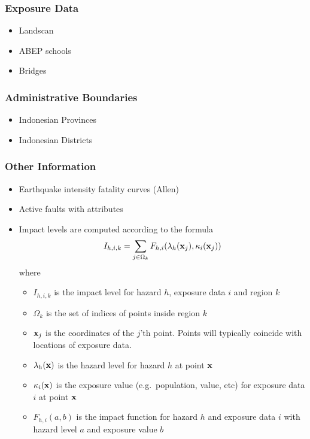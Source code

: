 \documentclass[a4paper]{article}
\begin{document}
\subsubsection*{Exposure Data}
\begin{itemize}  
  \item Landscan
  \item ABEP schools
  \item Bridges
\end{itemize} 

\subsubsection*{Administrative Boundaries}
\begin{itemize}  
   \item Indonesian Provinces
   \item Indonesian Districts
\end{itemize} 
   
\subsubsection*{Other Information}
\begin{itemize} 
  \item Earthquake intensity fatality curves (Allen)
  \item Active faults with attributes
  \item Impact levels are computed according to the formula
  \[
     I_{h,i,k} = \sum_{j \in \Omega_k} F_{h,i}(\lambda_h(\bold{x}_j), \kappa_i(\bold{x}_j))
  \] where
  \begin{itemize} 
    \item $I_{h,i,k}$ is the impact level for hazard $h$, exposure data $i$ and region $k$
    \item $\Omega_k$ is the set of indices of points inside region $k$
    \item $\bold{x}_j$ is the coordinates of the $j$'th point. Points will typically coincide with locations of exposure data.
    \item $\lambda_h(\bold{x})$ is the hazard level for hazard $h$ at point $\bold{x}$
    \item $\kappa_i(\bold{x})$ is the exposure value (e.g.\ population,  value, etc) for exposure data $i$ at point $\bold{x}$
    \item $F_{h,i}(a, b)$ is the impact function for hazard $h$ and exposure data $i$ with hazard level $a$ and exposure value $b$
  \end{itemize} 
\end{itemize} 
\end{document}
